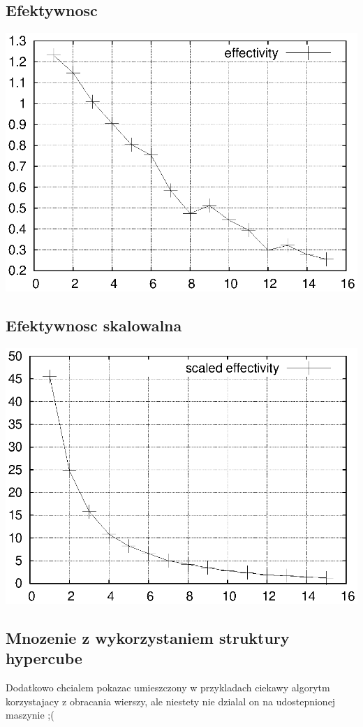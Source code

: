 \documentclass{article}
\begin{document}
\subsection{Efektywnosc}

\includegraphics{effect1.eps}

\subsection{Efektywnosc skalowalna}

\includegraphics{effect1_sc.eps}


\subsection{Mnozenie z wykorzystaniem struktury hypercube}
Dodatkowo chcialem pokazac umieszczony w przykladach ciekawy algorytm korzystajacy z obracania wierszy, ale niestety nie dzialal on na udostepnionej maszynie ;(
\end{document}
